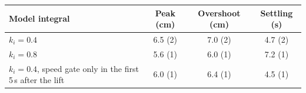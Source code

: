 \begin{tabularx}{\textwidth}{Xccc}
\toprule
Model integral & Peak (cm) & Overshoot (cm) & Settling (s) \\
\midrule
$k_i = 0.4$ & 6.5 (2) & 7.0 (2) & 4.7 (2) \\
$k_i = 0.8$ & 5.6 (1) & 6.0 (1) & 7.2 (1) \\
$k_i = 0.4$, speed gate only in the first 5\,s after the lift & 6.0 (1) & 6.4 (1) & 4.5 (1) \\
\bottomrule
\end{tabularx}
